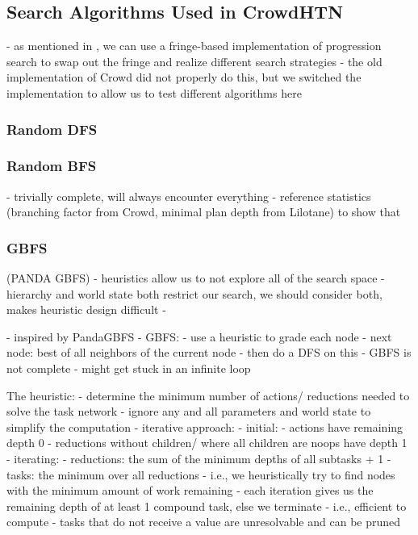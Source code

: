 \subsection{Search Algorithms Used in CrowdHTN}
- as mentioned in \cite{holler2020htn}, we can use a fringe-based implementation of progression search to swap out the fringe and realize different search strategies
- the old implementation of Crowd did not properly do this, but we switched the implementation to allow us to test different algorithms here

\subsubsection{Random DFS}


\subsubsection{Random BFS}
- trivially complete, will always encounter everything
- reference statistics (branching factor from Crowd, minimal plan depth from Lilotane) to show that 

\subsubsection{GBFS}
\cite{holler2020htn} (PANDA GBFS)
	- heuristics allow us to not explore all of the search space
	- hierarchy and world state both restrict our search, we should consider both, makes heuristic design difficult
	- 

- inspired by PandaGBFS
- GBFS:
	- use a heuristic to grade each node
	- next node: best of all neighbors of the current node
	- then do a DFS on this
- GBFS is not complete
- might get stuck in an infinite loop

The heuristic:
- determine the minimum number of actions/ reductions needed to solve the task network
- ignore any and all parameters and world state to simplify the computation
- iterative approach:
	- initial:
		- actions have remaining depth 0
		- reductions without children/ where all children are noops have depth 1
	- iterating:
		- reductions: the sum of the minimum depths of all subtasks + 1
		- tasks: the minimum over all reductions
- i.e., we heuristically try to find nodes with the minimum amount of work remaining
- each iteration gives us the remaining depth of at least 1 compound task, else we terminate
- i.e., efficient to compute
- tasks that do not receive a value are unresolvable and can be pruned

